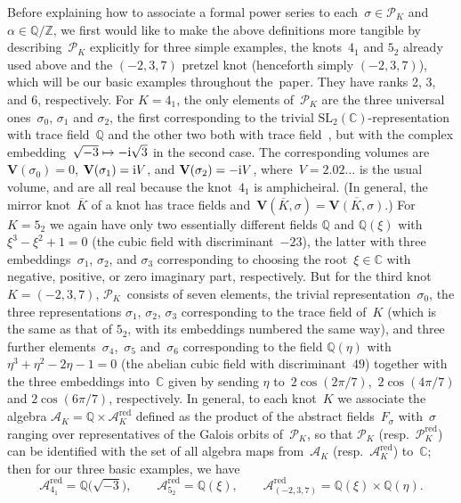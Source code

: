 \documentclass[pdftex]{sigma}
\numberwithin{equation}{section}
\def\BQ{\mathbb Q}
\def\BC{\mathbb C}
\def\calA{\mathcal A}
\def\calP{\mathcal P}
\def\calP{\mathcal P}
\def\SL{\mathrm{SL}}
\def\a{\alpha}
\def\Z{\mathbb Z}
\def\Q{\mathbb Q}
\def\a{\alpha}
\def\s{\sigma}
\def\V{\mathbf V}
\def\be{\begin{equation}}
\def\ee{\end{equation}}
\def\RED{^{\text{red}}}
\begin{document}
Before explaining how to associate a formal power series to
each~$\s\in\calP_K$ and $\a\in\Q/\Z$, we first would like to make the above
definitions more tangible by describing~$\calP_K$ explicitly for three
simple examples, the knots~$4_1$ and $5_2$ already used above and the
$(-2,3,7)$ pretzel knot (henceforth simply $(-2,3,7)$), which
will be our basic examples throughout the~paper. They have ranks 2, 3, and 6,
respectively. For $K=4_1$, the only elements
of~$\calP_K$ are the three universal ones~$\s_0$, $\s_1$ and $\s_2$, the
first corresponding to the trivial $\SL_2(\BC)$-representation with trace
field~$\Q$ and the other two both with trace
field~\smash{$\Q\big(\sqrt{-3}\big)$}, but with the complex embedding~${\sqrt{-3}\mapsto -{\rm i}\sqrt3}$ in the second case. The corresponding volumes
are $\V(\s_0)=0$, $\V(\s_1)={\rm i}V$, and $\V(\s_2)=-{\rm i}V$, where~${V=2.02\dots}$
is the usual volume, and are all real because the knot~$4_1$ is amphicheiral.
\big(In general, the mirror knot~$\overline K$ of a knot has trace fields
\smash{$F_{\overline K,\s}=\overline{F_{K,\s}}$} and~$\V(\overline K,\s)=\overline{\V(K,\s)}$.\big) For~${K=5_2}$ we again have
only two essentially different fields $\Q$ and $\Q(\xi)$ with
${\xi^3-\xi^2+1=0}$ (the cubic field with discriminant~$-23$), the latter with
three embeddings~$\s_1$, $\s_2$, and $\s_3$ corresponding to choosing the
root~$\xi\in\BC$ with negative, positive, or zero imaginary part,
respectively. But for the third knot~$K=(-2,3,7)$, $\calP_K$~consists of
seven elements, the trivial representation~$\s_0$, the three representations
$\s_1$, $\s_2$, $\s_3$ corresponding to the trace field of~$K$ (which is the
same as that of $5_2$, with its embeddings numbered the same way), and three
further elements~$\s_4$,~$\s_5$ and~$\s_6$ corresponding to the field
$\Q(\eta)$ with $\eta^3+\eta^2-2\eta-1=0$ (the abelian cubic field with
discriminant~$49$) together with the three embeddings into~$\BC$ given by
sending $\eta$ to~$2\cos(2\pi/7)$,~$2\cos(4\pi/7)$ and $2\cos(6\pi/7)$, respectively.
In general, to each knot~$K$ we associate the algebra $\calA_K=\Q\times\calA\RED_K$
defined as the product of the abstract fields~$F_\s$ with~$\s$ ranging over
representatives of the Galois orbits of~$\calP_K$, so that $\calP_K$ \big(resp.\ $\calP\RED_K$\big)
can be identified with the set of all algebra maps from~$\calA_K$ \big(resp.\ $\calA\RED_K$\big)
to~$\BC$; then for our three basic examples, we have
\be
\label{AK}
\calA\RED_{4_1} = \BQ\big(\sqrt{-3}\big) , \qquad \calA\RED_{5_2} = \BQ(\xi) , \qquad
\calA\RED_{(-2,3,7)} = \BQ(\xi)\times\BQ(\eta) .
\ee
\end{document}
